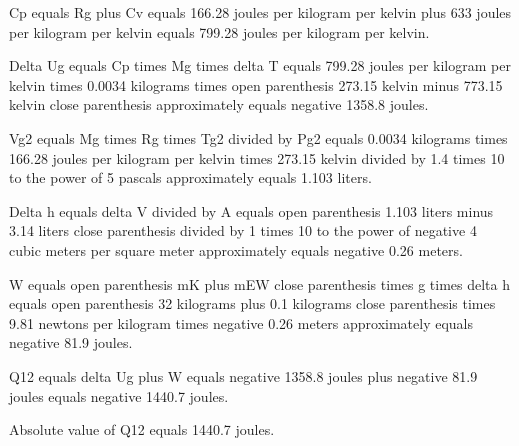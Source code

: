 Cp equals Rg plus Cv equals 166.28 joules per kilogram per kelvin plus 633 joules per kilogram per kelvin equals 799.28 joules per kilogram per kelvin.  

Delta Ug equals Cp times Mg times delta T equals 799.28 joules per kilogram per kelvin times 0.0034 kilograms times open parenthesis 273.15 kelvin minus 773.15 kelvin close parenthesis approximately equals negative 1358.8 joules.  

Vg2 equals Mg times Rg times Tg2 divided by Pg2 equals 0.0034 kilograms times 166.28 joules per kilogram per kelvin times 273.15 kelvin divided by 1.4 times 10 to the power of 5 pascals approximately equals 1.103 liters.  

Delta h equals delta V divided by A equals open parenthesis 1.103 liters minus 3.14 liters close parenthesis divided by 1 times 10 to the power of negative 4 cubic meters per square meter approximately equals negative 0.26 meters.  

W equals open parenthesis mK plus mEW close parenthesis times g times delta h equals open parenthesis 32 kilograms plus 0.1 kilograms close parenthesis times 9.81 newtons per kilogram times negative 0.26 meters approximately equals negative 81.9 joules.  

Q12 equals delta Ug plus W equals negative 1358.8 joules plus negative 81.9 joules equals negative 1440.7 joules.  

Absolute value of Q12 equals 1440.7 joules.